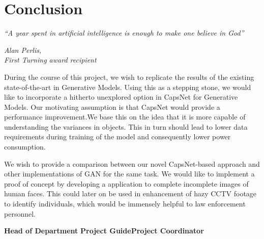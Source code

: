 \chapter{Conclusion}\label{ch:conclusion}
\epigraph{\textit{\Large “A year spent in artificial intelligence is enough to make one believe in God”}}{\textit{ \large Alan Perlis,\\ First Turning award recipient}}
During the course of this project, we wish to replicate the results of the existing state-of-the-art in Generative Models. Using this as a stepping stone, we would like to incorporate a hitherto unexplored option in CapsNet for Generative Models. Our motivating assumption is that CapsNet would provide a performance improvement.We base this on the idea that it is more capable of understanding the variances in objects. This in turn should lead to lower data requirements during training of the model and consequently lower power consumption. 

\par\bigskip We wish to provide a comparison between our novel CapsNet-based approach and other implementations of GAN for the same task. We would like to implement a proof of concept by developing a application to complete incomplete images of human faces. This could later on be used in enhancement of hazy CCTV footage to identify individuals, which would be immensely helpful to law enforcement personnel.

\vspace{200px}
\centering
\textbf{Head of Department}
\vspace{50px}
\flushleft\textbf{Project Guide}\hfill\textbf{Project Coordinator}